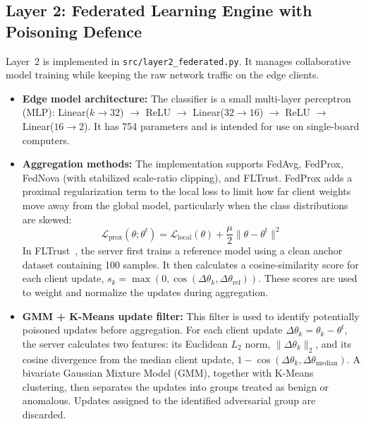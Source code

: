 \documentclass[11pt,a4paper]{article}
\begin{document}
\subsection{Layer 2: Federated Learning Engine with Poisoning Defence}
Layer~2 is implemented in \texttt{src/layer2\_federated.py}. It manages collaborative model training while keeping the raw network traffic on the edge clients.
\begin{itemize}[leftmargin=1.6em,itemsep=1pt]
    \item \textbf{Edge model architecture:} The classifier is a small multi-layer perceptron (MLP): Linear($k \to 32$) $\to$ ReLU $\to$ Linear($32 \to 16$) $\to$ ReLU $\to$ Linear($16 \to 2$). It has 754 parameters and is intended for use on single-board computers.
    \item \textbf{Aggregation methods:} The implementation supports FedAvg, FedProx, FedNova (with stabilized scale-ratio clipping), and FLTrust. FedProx adds a proximal regularization term to the local loss to limit how far client weights move away from the global model, particularly when the class distributions are skewed:
    \begin{equation}
        \mathcal{L}_{\text{prox}}(\theta; \theta^t) = \mathcal{L}_{\text{local}}(\theta) + \frac{\mu}{2} \|\theta - \theta^t\|^2
    \end{equation}
    In FLTrust~\cite{cao2021fltrust}, the server first trains a reference model using a clean anchor dataset containing 100 samples. It then calculates a cosine-similarity score for each client update, $s_k = \max(0, \cos(\Delta\theta_k, \Delta\theta_{\text{ref}}))$. These scores are used to weight and normalize the updates during aggregation.
    \item \textbf{GMM + K-Means update filter:} This filter is used to identify potentially poisoned updates before aggregation. For each client update $\Delta \theta_k = \theta_k - \theta^t$, the server calculates two features: its Euclidean $L_2$ norm, $\|\Delta \theta_k\|_2$, and its cosine divergence from the median client update, $1 - \cos(\Delta \theta_k, \Delta \theta_{\text{median}})$. A bivariate Gaussian Mixture Model (GMM), together with K-Means clustering, then separates the updates into groups treated as benign or anomalous. Updates assigned to the identified adversarial group are discarded.
\end{itemize}
\end{document}
